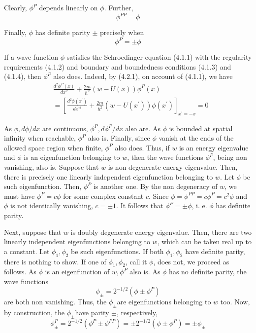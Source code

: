 \documentclass{article}
\begin{document}
Clearly, $\phi^{P}$ depends linearly on $\phi$. Further,
$$
\begin{equation*}
\phi^{P P}=\phi \tag{4.2.4}
\end{equation*}
$$

Finally, $\phi$ has definite parity $\pm$ precisely when
$$
\begin{equation*}
\phi^{P}= \pm \phi \tag{4.2.5}
\end{equation*}
$$

If a wave function $\phi$ satisfies the Schroedinger equation (4.1.1) with the regularity requirements (4.1.2) and boundary and boundedness conditions (4.1.3) and (4.1.4), then $\phi^{P}$ also does. Indeed, by (4.2.1), on account of (4.1.1), we have
$$
\begin{align*}
& \frac{d^{2} \phi^{P}(x)}{d x^{2}}+\frac{2 m}{\hbar^{2}}(w-U(x)) \phi^{P}(x)  \tag{4.2.6}\\
&=\left[\frac{d^{2} \phi\left(x^{\prime}\right)}{d x^{\prime 2}}+\frac{2 m}{\hbar^{2}}\left(w-U\left(x^{\prime}\right)\right) \phi\left(x^{\prime}\right)\right]_{x^{\prime}=-x}=0
\end{align*}
$$

As $\phi, d \phi / d x$ are continuous, $\phi^{P}, d \phi^{P} / d x$ also are. As $\phi$ is bounded at spatial infinity when reachable, $\phi^{P}$ also is. Finally, since $\phi$ vanish at the ends of the allowed space region when finite, $\phi^{P}$ also does. Thus, if $w$ is an energy eigenvalue and $\phi$ is an
eigenfunction belonging to $w$, then the wave functions $\phi^{P}$, being non vanishing, also is.
Suppose that $w$ is non degenerate energy eigenvalue. Then, there is precisely one linearly independent eigenfunction belonging to $w$. Let $\phi$ be such eigenfunction. Then, $\phi^{P}$ is another one. By the non degeneracy of $w$, we must have $\phi^{P}=c \phi$ for some complex constant $c$. Since $\phi=\phi^{P P}=c \phi^{P}=c^{2} \phi$ and $\phi$ is not identically vanishing, $c= \pm 1$. It follows that $\phi^{P}= \pm \phi$, i. e. $\phi$ has definite parity.

Next, suppose that $w$ is doubly degenerate energy eigenvalue. Then, there are two linearly independent eigenfunctions belonging to $w$, which can be taken real up to a constant. Let $\phi_{1}, \phi_{2}$ be such eigenfunctions. If both $\phi_{1}, \phi_{2}$ have definite parity, there is nothing to show. If one of $\phi_{1}, \phi_{2}$, call it $\phi$, does not, we proceed as follows. As $\phi$ is an eigenfunction of $w, \phi^{P}$ also is. As $\phi$ has no definite parity, the wave functions
$$
\begin{equation*}
\phi_{ \pm}=2^{-1 / 2}\left(\phi \pm \phi^{P}\right) \tag{4.2.7}
\end{equation*}
$$
are both non vanishing. Thus, the $\phi_{ \pm}$are eigenfunctions belonging to $w$ too. Now, by construction, the $\phi_{ \pm}$have parity $\pm$, respectively,
$$
\begin{equation*}
\phi_{ \pm}^{P}=2^{-1 / 2}\left(\phi^{P} \pm \phi^{P P}\right)= \pm 2^{-1 / 2}\left(\phi \pm \phi^{P}\right)= \pm \phi_{ \pm} \tag{4.2.8}
\end{equation*}
$$
\end{document}
